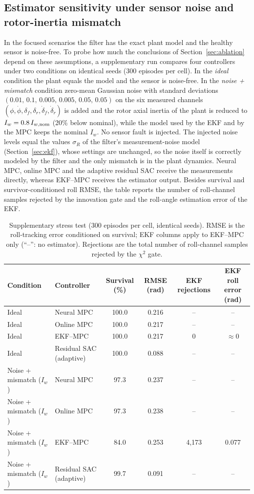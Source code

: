 \documentclass[preprint,12pt,authoryear=false]{elsarticle}
\theoremstyle{remark}\newtheorem{remark}{Remark}
\theoremstyle{plain}\newtheorem{proposition}{Proposition}\newtheorem{lemma}{Lemma}
\theoremstyle{definition}\newtheorem{assumption}{Assumption}
\begin{document}
\subsection{Estimator sensitivity under sensor noise and rotor-inertia mismatch}\label{sec:noisemis}
In the focused scenarios the filter has the exact plant model and the healthy sensor is noise-free. To probe how much the conclusions of Section~\ref{sec:ablation} depend on these assumptions, a supplementary run compares four controllers under two conditions on identical seeds (300 episodes per cell). In the \emph{ideal} condition the plant equals the model and the sensor is noise-free. In the \emph{noise + mismatch} condition zero-mean Gaussian noise with standard deviations $(0.01,\,0.1,\,0.005,\,0.005,\,0.05,\,0.05)$ on the six measured channels $(\phi,\dot\phi,\delta_f,\delta_r,\dot\delta_f,\dot\delta_r)$ is added and the rotor axial inertia of the plant is reduced to $I_w=0.8\,I_{w,\rm nom}$ (20\% below nominal), while the model used by the EKF and by the MPC keeps the nominal $I_w$. No sensor fault is injected. The injected noise levels equal the values $\sigma_R$ of the filter's measurement-noise model (Section~\ref{sec:ekf}), whose settings are unchanged, so the noise itself is correctly modeled by the filter and the only mismatch is in the plant dynamics. Neural MPC, online MPC and the adaptive residual SAC receive the measurements directly, whereas EKF--MPC receives the estimator output. Besides survival and survivor-conditioned roll RMSE, the table reports the number of roll-channel samples rejected by the innovation gate and the roll-angle estimation error of the EKF.

\begin{table}[t]\centering\small
\caption{Supplementary stress test (300 episodes per cell, identical seeds). RMSE is the roll-tracking error conditioned on survival; EKF columns apply to EKF--MPC only (``--'': no estimator). Rejections are the total number of roll-channel samples rejected by the $\chi^2$ gate.}\label{tab:noisemis}
\begin{tabular}{llcccc}\toprule
Condition & Controller & Survival (\%) & RMSE (rad) & EKF rejections & EKF roll error (rad)\\\midrule
Ideal & Neural MPC & 100.0 & 0.216 & -- & --\\
Ideal & Online MPC & 100.0 & 0.217 & -- & --\\
Ideal & EKF--MPC & 100.0 & 0.217 & 0 & $\approx 0$\\
Ideal & Residual SAC (adaptive) & 100.0 & 0.088 & -- & --\\\midrule
Noise + mismatch ($I_w$) & Neural MPC & 97.3 & 0.237 & -- & --\\
Noise + mismatch ($I_w$) & Online MPC & 97.3 & 0.238 & -- & --\\
Noise + mismatch ($I_w$) & EKF--MPC & 84.0 & 0.253 & 4{,}173 & 0.077\\
Noise + mismatch ($I_w$) & Residual SAC (adaptive) & 99.7 & 0.091 & -- & --\\\bottomrule
\end{tabular}
\end{table}
\end{document}
